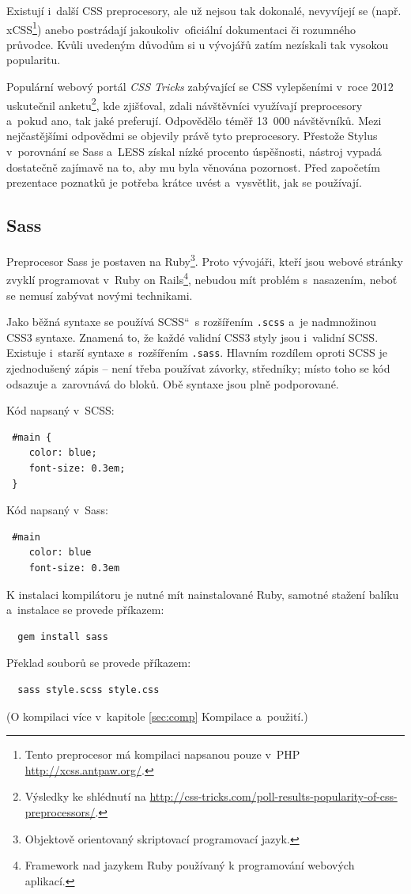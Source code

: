 \documentclass[thesis=B,czech]{FITthesis}[2012/06/26]
\begin{document}
Existují i~další \gls{CSS} preprocesory, ale už nejsou tak dokonalé, nevyvíjejí se (např. xCSS\footnote{Tento preprocesor má kompilaci napsanou pouze v~\gls{PHP} \url{http://xcss.antpaw.org/}.}) anebo postrádají jakoukoliv~oficiální dokumentaci či rozumného průvodce. Kvůli uvedeným důvodům si u vývojářů zatím nezískali tak vysokou popularitu.

Populární webový portál \textit{CSS Tricks} zabývající se \gls{CSS} vylepšeními v~roce 2012 uskutečnil anketu\footnote{Výsledky ke shlédnutí na \url{http://css-tricks.com/poll-results-popularity-of-css-preprocessors/}.}, kde zjišťoval, zdali návštěvníci využívají preprocesory a~pokud ano, tak jaké preferují. Odpovědělo téměř 13~000 návštěvníků. Mezi nejčastějšími odpovědmi se objevily právě tyto preprocesory. Přestože Stylus v~porovnání se \gls{Sass} a~LESS získal nízké procento úspěšnosti, nástroj vypadá dostatečně zajímavě na to, aby mu byla věnována pozornost. Před započetím prezentace poznatků je potřeba krátce uvést a~vysvětlit, jak se používají. 


\subsection{Sass}

Preprocesor \gls{Sass} je postaven na Ruby\footnote{Objektově orientovaný skriptovací programovací jazyk.}. Proto vývojáři, kteří jsou webové stránky zvyklí programovat v~Ruby on Rails\footnote{Framework nad jazykem Ruby používaný k programování webových aplikací.}, nebudou mít problém s~nasazením, neboť se nemusí zabývat novými technikami. 

Jako běžná syntaxe se používá \quotedblbase SCSS\textquotedblleft   ~s rozšířením \verb#.scss# a~je nadmnožinou CSS3 syntaxe. Znamená to, že každé validní CSS3 styly jsou i~validní SCSS. Existuje i~starší syntaxe s~rozšířením \verb#.sass#. Hlavním rozdílem oproti SCSS je zjednodušený zápis -- není třeba používat závorky, středníky; místo toho se kód odsazuje a~zarovnává do bloků. Obě syntaxe jsou plně podporované.

\noindent Kód napsaný v~SCSS:
\scriptsize
\begin{verbatim}
 #main {
    color: blue;
    font-size: 0.3em;
 }
\end{verbatim}
\normalsize
Kód napsaný v~\gls{Sass}:
\scriptsize
\begin{verbatim}
 #main
    color: blue
    font-size: 0.3em
\end{verbatim}
\normalsize
K instalaci kompilátoru je nutné mít nainstalované Ruby, samotné stažení balíku a~instalace se provede příkazem:
\scriptsize
\begin{verbatim}
  gem install sass
\end{verbatim}
\normalsize
Překlad souborů se provede příkazem:
\scriptsize
\begin{verbatim}
  sass style.scss style.css
\end{verbatim}
\normalsize
(O kompilaci více v~kapitole \ref{sec:comp} Kompilace a~použití.)
\end{document}
